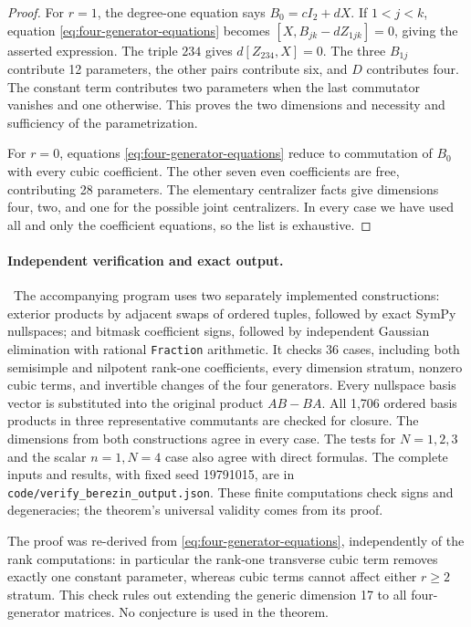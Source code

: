 \begin{proof}
For \(r=1\), the degree-one equation says \(B_0=cI_2+dX\). If \(1<j<k\), equation \eqref{eq:four-generator-equations} becomes \([X,B_{jk}-dZ_{1jk}]=0\), giving the asserted expression. The triple \(234\) gives \(d[Z_{234},X]=0\). The three \(B_{1j}\) contribute 12 parameters, the other pairs contribute six, and \(D\) contributes four. The constant term contributes two parameters when the last commutator vanishes and one otherwise. This proves the two dimensions and necessity and sufficiency of the parametrization.

For \(r=0\), equations \eqref{eq:four-generator-equations} reduce to commutation of \(B_0\) with every cubic coefficient. The other seven even coefficients are free, contributing 28 parameters. The elementary centralizer facts give dimensions four, two, and one for the possible joint centralizers. In every case we have used all and only the coefficient equations, so the list is exhaustive.
\end{proof}

\paragraph{Independent verification and exact output.}
\oursComputed\ The accompanying program uses two separately implemented constructions: exterior products by adjacent swaps of ordered tuples, followed by exact SymPy nullspaces; and bitmask coefficient signs, followed by independent Gaussian elimination with rational \texttt{Fraction} arithmetic. It checks 36 cases, including both semisimple and nilpotent rank-one coefficients, every dimension stratum, nonzero cubic terms, and invertible changes of the four generators. Every nullspace basis vector is substituted into the original product \(AB-BA\). All 1,706 ordered basis products in three representative commutants are checked for closure. The dimensions from both constructions agree in every case. The tests for \(N=1,2,3\) and the scalar \(n=1,N=4\) case also agree with direct formulas. The complete inputs and results, with fixed seed 19791015, are in \texttt{code/verify\_berezin\_output.json}. These finite computations check signs and degeneracies; the theorem's universal validity comes from its proof.

The proof was re-derived from \eqref{eq:four-generator-equations}, independently of the rank computations: in particular the rank-one transverse cubic term removes exactly one constant parameter, whereas cubic terms cannot affect either \(r\geq2\) stratum. This check rules out extending the generic dimension 17 to all four-generator matrices. No conjecture is used in the theorem.

